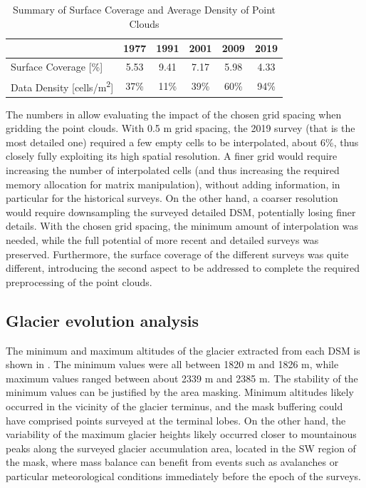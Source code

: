 {\begin{table}[ht]
  \centering
  \caption{Summary of Surface Coverage and Average Density of Point Clouds}
  \label{tab:2:pcd_surface_coverage}
  \begin{tabular}{lccccc}
    \hline
    & 1977 & 1991 & 2001 & 2009 & 2019 \\
    \hline
    Surface Coverage [\%] & 5.53 & 9.41 & 7.17 & 5.98 & 4.33 \\
    Data Density [cells/m\textsuperscript{2}] & 37\% & 11\% & 39\% & 60\% & 94\% \\
    \hline
  \end{tabular}
\end{table}

The numbers in  allow evaluating the impact of the chosen grid spacing when gridding the point clouds. 
With 0.5 m grid spacing, the 2019 survey (that is the most detailed one) required a few empty cells to be interpolated, about 6\%, thus closely fully exploiting its high spatial resolution. 
A finer grid would require increasing the number of interpolated cells (and thus increasing the required memory allocation for matrix manipulation), without adding information, in particular for the historical surveys.
On the other hand, a coarser resolution would require downsampling the surveyed detailed DSM, potentially losing finer details. 
With the chosen grid spacing, the minimum amount of interpolation was needed, while the full potential of more recent and detailed surveys was preserved. 
Furthermore, the surface coverage of the different surveys was quite different, introducing the second aspect to be addressed to complete the required preprocessing of the point clouds.

\subsection{Glacier evolution analysis}{\label{sec:2:res_glacier_evolution}

The minimum and maximum altitudes of the glacier extracted from each DSM is shown in .
The minimum values were all between 1820 m and 1826 m, while maximum values ranged between about 2339 m and 2385 m. 
The stability of the minimum values can be justified by the area masking. 
Minimum altitudes likely occurred in the vicinity of the glacier terminus, and the mask buffering could have comprised points surveyed at the terminal lobes.
On the other hand, the variability of the maximum glacier heights likely occurred closer to mountainous peaks along the surveyed glacier accumulation area, located in the SW region of the mask, where mass balance can benefit from events such as avalanches or particular meteorological conditions immediately before the epoch of the surveys.

}}
